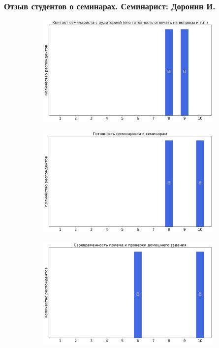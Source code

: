     \subsubsection{Отзыв студентов о семинарах. Семинарист: Доронин И.}
		\begin{figure}[H]
			\centering
			\begin{subfigure}[b]{0.45\textwidth}
				\centering
				\includegraphics[width=\textwidth]{images/4 course/Квантовая механика/seminarists-marks-Доронин И.-0.png}
			\end{subfigure}
			\begin{subfigure}[b]{0.45\textwidth}
				\centering
				\includegraphics[width=\textwidth]{images/4 course/Квантовая механика/seminarists-marks-Доронин И.-1.png}
			\end{subfigure}
			\begin{subfigure}[b]{0.45\textwidth}
				\centering
				\includegraphics[width=\textwidth]{images/4 course/Квантовая механика/seminarists-marks-Доронин И.-2.png}

\end{subfigure}
\end{figure}

